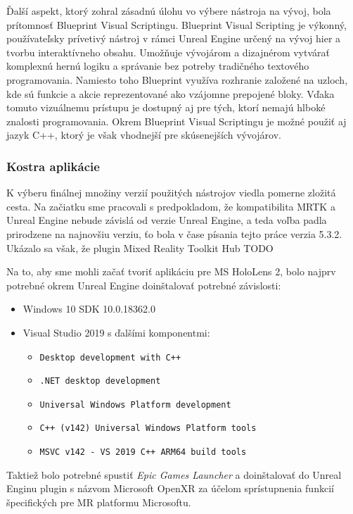 Ďalší aspekt, ktorý zohral zásadnú úlohu vo výbere nástroja na vývoj, bola prítomnosť Blueprint Visual Scriptingu. Blueprint Visual Scripting je výkonný, používateľsky prívetivý nástroj v rámci 
Unreal Engine určený na vývoj hier a tvorbu interaktívneho obsahu. Umožňuje vývojárom a dizajnérom vytvárať komplexnú hernú logiku a správanie bez potreby tradičného textového programovania. Namiesto toho 
Blueprint využíva rozhranie založené na uzloch, kde sú funkcie a akcie reprezentované ako vzájomne prepojené bloky. Vďaka tomuto vizuálnemu prístupu je dostupný aj pre tých, ktorí nemajú hlboké znalosti programovania.
Okrem Blueprint Visual Scriptingu je možné použiť aj jazyk C++, ktorý je však vhodnejší pre skúsenejších vývojárov.

\subsubsection{Kostra aplikácie}
K výberu finálnej množiny verzií použitých nástrojov viedla pomerne zložitá cesta. Na začiatku sme pracovali s predpokladom, že kompatibilita MRTK a Unreal Engine nebude závislá od verzie Unreal
Engine, a teda voľba padla prirodzene na najnovšiu verziu, ťo bola v čase písania tejto práce verzia 5.3.2. Ukázalo sa však, že plugin Mixed Reality Toolkit Hub TODO

Na to, aby sme mohli začať tvoriť aplikáciu pre MS HoloLens 2, bolo najprv potrebné okrem Unreal Engine doinštalovať potrebné závislosti:
\begin{itemize}
  \item Windows 10 SDK 10.0.18362.0
  \item Visual Studio 2019 s ďalšími komponentmi:
  \begin{itemize}    
    \item \texttt{Desktop development with C++}
    \item \texttt{.NET desktop development}
    \item \texttt{Universal Windows Platform development}
    \item \texttt{C++ (v142) Universal Windows Platform tools}
    \item \texttt{MSVC v142 - VS 2019 C++ ARM64 build tools}    
  \end{itemize}
\end{itemize}

Taktiež bolo potrebné spustiť \emph{Epic Games Launcher} a doinštalovať do Unreal Enginu plugin s názvom Microsoft OpenXR za účelom sprístupnenia funkcií špecifických pre MR platformu Microsoftu.

